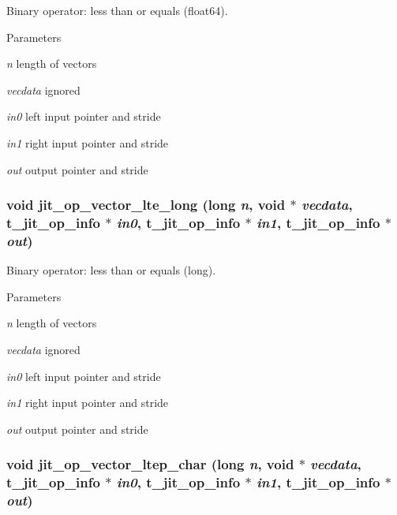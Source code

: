 Binary operator: less than or equals (float64). 
\begin{DoxyParams}{Parameters}
\item[{\em n}]length of vectors \item[{\em vecdata}]ignored \item[{\em in0}]left input pointer and stride \item[{\em in1}]right input pointer and stride \item[{\em out}]output pointer and stride \end{DoxyParams}
\hypertarget{group__opvecmod_ga50c14b50b918b96fc426e73781c365a4}{
\subsubsection[{jit\_\-op\_\-vector\_\-lte\_\-long}]{\setlength{\rightskip}{0pt plus 5cm}void jit\_\-op\_\-vector\_\-lte\_\-long (long {\em n}, \/  void $\ast$ {\em vecdata}, \/  {\bf t\_\-jit\_\-op\_\-info} $\ast$ {\em in0}, \/  {\bf t\_\-jit\_\-op\_\-info} $\ast$ {\em in1}, \/  {\bf t\_\-jit\_\-op\_\-info} $\ast$ {\em out})}}
\label{group__opvecmod_ga50c14b50b918b96fc426e73781c365a4}


Binary operator: less than or equals (long). 
\begin{DoxyParams}{Parameters}
\item[{\em n}]length of vectors \item[{\em vecdata}]ignored \item[{\em in0}]left input pointer and stride \item[{\em in1}]right input pointer and stride \item[{\em out}]output pointer and stride \end{DoxyParams}
\hypertarget{group__opvecmod_ga718042764418c7fd79c70105564c8eb6}{
\subsubsection[{jit\_\-op\_\-vector\_\-ltep\_\-char}]{\setlength{\rightskip}{0pt plus 5cm}void jit\_\-op\_\-vector\_\-ltep\_\-char (long {\em n}, \/  void $\ast$ {\em vecdata}, \/  {\bf t\_\-jit\_\-op\_\-info} $\ast$ {\em in0}, \/  {\bf t\_\-jit\_\-op\_\-info} $\ast$ {\em in1}, \/  {\bf t\_\-jit\_\-op\_\-info} $\ast$ {\em out})}}
\label{group__opvecmod_ga718042764418c7fd79c70105564c8eb6}


